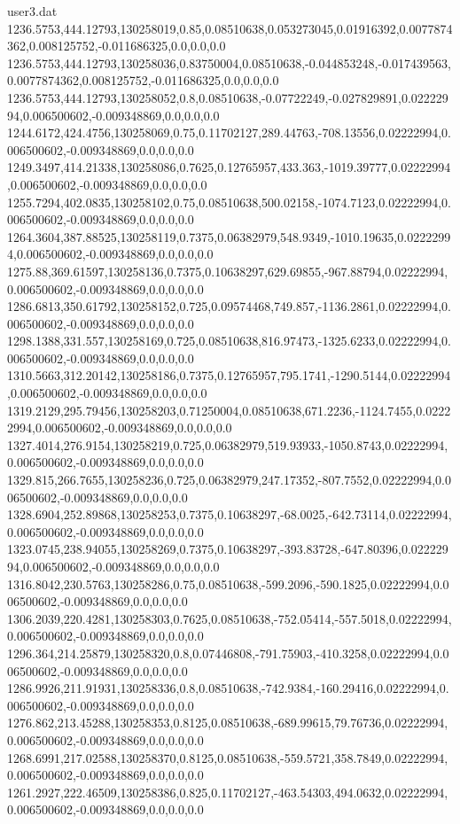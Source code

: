 \begin{filecontents}{user3.dat}
1236.5753,444.12793,130258019,0.85,0.08510638,0.053273045,0.01916392,0.0077874362,0.008125752,-0.011686325,0.0,0.0,0.0
1236.5753,444.12793,130258036,0.83750004,0.08510638,-0.044853248,-0.017439563,0.0077874362,0.008125752,-0.011686325,0.0,0.0,0.0
1236.5753,444.12793,130258052,0.8,0.08510638,-0.07722249,-0.027829891,0.02222994,0.006500602,-0.009348869,0.0,0.0,0.0
1244.6172,424.4756,130258069,0.75,0.11702127,289.44763,-708.13556,0.02222994,0.006500602,-0.009348869,0.0,0.0,0.0
1249.3497,414.21338,130258086,0.7625,0.12765957,433.363,-1019.39777,0.02222994,0.006500602,-0.009348869,0.0,0.0,0.0
1255.7294,402.0835,130258102,0.75,0.08510638,500.02158,-1074.7123,0.02222994,0.006500602,-0.009348869,0.0,0.0,0.0
1264.3604,387.88525,130258119,0.7375,0.06382979,548.9349,-1010.19635,0.02222994,0.006500602,-0.009348869,0.0,0.0,0.0
1275.88,369.61597,130258136,0.7375,0.10638297,629.69855,-967.88794,0.02222994,0.006500602,-0.009348869,0.0,0.0,0.0
1286.6813,350.61792,130258152,0.725,0.09574468,749.857,-1136.2861,0.02222994,0.006500602,-0.009348869,0.0,0.0,0.0
1298.1388,331.557,130258169,0.725,0.08510638,816.97473,-1325.6233,0.02222994,0.006500602,-0.009348869,0.0,0.0,0.0
1310.5663,312.20142,130258186,0.7375,0.12765957,795.1741,-1290.5144,0.02222994,0.006500602,-0.009348869,0.0,0.0,0.0
1319.2129,295.79456,130258203,0.71250004,0.08510638,671.2236,-1124.7455,0.02222994,0.006500602,-0.009348869,0.0,0.0,0.0
1327.4014,276.9154,130258219,0.725,0.06382979,519.93933,-1050.8743,0.02222994,0.006500602,-0.009348869,0.0,0.0,0.0
1329.815,266.7655,130258236,0.725,0.06382979,247.17352,-807.7552,0.02222994,0.006500602,-0.009348869,0.0,0.0,0.0
1328.6904,252.89868,130258253,0.7375,0.10638297,-68.0025,-642.73114,0.02222994,0.006500602,-0.009348869,0.0,0.0,0.0
1323.0745,238.94055,130258269,0.7375,0.10638297,-393.83728,-647.80396,0.02222994,0.006500602,-0.009348869,0.0,0.0,0.0
1316.8042,230.5763,130258286,0.75,0.08510638,-599.2096,-590.1825,0.02222994,0.006500602,-0.009348869,0.0,0.0,0.0
1306.2039,220.4281,130258303,0.7625,0.08510638,-752.05414,-557.5018,0.02222994,0.006500602,-0.009348869,0.0,0.0,0.0
1296.364,214.25879,130258320,0.8,0.07446808,-791.75903,-410.3258,0.02222994,0.006500602,-0.009348869,0.0,0.0,0.0
1286.9926,211.91931,130258336,0.8,0.08510638,-742.9384,-160.29416,0.02222994,0.006500602,-0.009348869,0.0,0.0,0.0
1276.862,213.45288,130258353,0.8125,0.08510638,-689.99615,79.76736,0.02222994,0.006500602,-0.009348869,0.0,0.0,0.0
1268.6991,217.02588,130258370,0.8125,0.08510638,-559.5721,358.7849,0.02222994,0.006500602,-0.009348869,0.0,0.0,0.0
1261.2927,222.46509,130258386,0.825,0.11702127,-463.54303,494.0632,0.02222994,0.006500602,-0.009348869,0.0,0.0,0.0

\end{filecontents}
